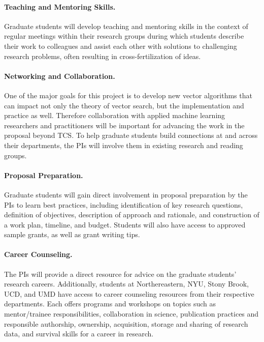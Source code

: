 \paragraph{Teaching and Mentoring Skills.} Graduate students will develop teaching and mentoring skills in the context of regular meetings within their research groups during which students describe their work to colleagues and assist each other with solutions to challenging research problems, often resulting in cross-fertilization of ideas.

\paragraph{Networking and Collaboration.} One of the major goals for this project is to develop new vector algorithms that can impact not only the theory of vector search, but the implementation and practice as well. Therefore collaboration with applied machine learning researchers and practitioners will be important for advancing the work in the proposal beyond TCS. To help graduate students build connections at and across their departments, the PIs will involve them in existing research and reading groups. 

\paragraph{Proposal Preparation.} Graduate students will gain direct involvement in proposal preparation by the PIs to learn best practices, including identification of key research questions, definition of objectives, description of approach and rationale, and construction of a work plan, timeline, and budget. Students will also have access to approved sample grants, as well as grant writing tips.

\paragraph{Career Counseling.} The PIs will provide a direct resource for advice on the graduate students’ research careers. Additionally, students at Northereastern, NYU, Stony Brook, UCD, and UMD have access to career counseling resources from their respective departments. Each offers programs and workshops on topics such as mentor/trainee responsibilities, collaboration in science, publication practices and responsible authorship, ownership, acquisition, storage and sharing of research data, and survival skills for a career in research.

